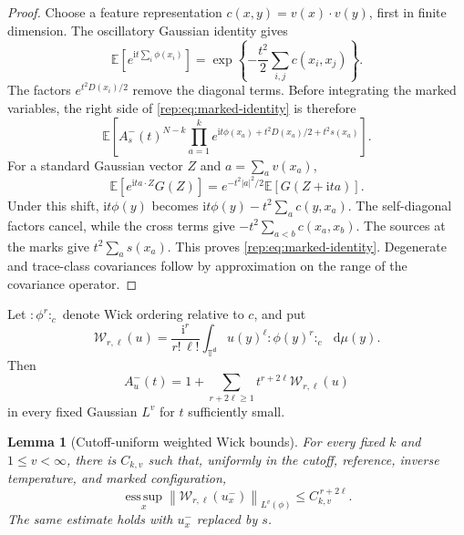 \documentclass[11pt,reqno]{amsart}
\numberwithin{equation}{section}
\theoremstyle{plain}
\newtheorem{lemma}[lemma]{Lemma}
\theoremstyle{definition}
\renewcommand{\d}{\mathsf d}
\newcommand{\dd}{\mathop{}\!\mathrm d}
\newcommand{\T}{\mathbb T}
\newcommand{\E}{\mathbb E}
\begin{document}
\begin{proof}
Choose a feature representation $c(x,y)=v(x)\cdot v(y)$, first in finite dimension. The oscillatory Gaussian identity gives
\begin{equation}\label{rep:eq:pre-shift}
 \E\left[e^{\mathrm{i} t\sum_i\phi(x_i)}\right]
 =\exp\left\{-\frac{t^2}{2}\sum_{i,j}c(x_i,x_j)\right\}.
\end{equation}
The factors $e^{t^2D(x_i)/2}$ remove the diagonal terms. Before integrating the marked variables, the right side of \eqref{rep:eq:marked-identity} is therefore
\begin{equation}\label{rep:eq:before-complex-shift}
 \E\left[A^-_s(t)^{N-k}\prod_{a=1}^k
 e^{\mathrm{i} t\phi(x_a)+t^2D(x_a)/2+t^2s(x_a)}\right].
\end{equation}
For a standard Gaussian vector $Z$ and $a=\sum_av(x_a)$,
\begin{equation}\label{rep:eq:complex-CM}
 \E\left[e^{\mathrm{i} t a\cdot Z}G(Z)\right]
 =e^{-t^2|a|^2/2}\E[G(Z+\mathrm{i} t a)].
\end{equation}
Under this shift, $\mathrm{i} t\phi(y)$ becomes $\mathrm{i} t\phi(y)-t^2\sum_ac(y,x_a)$. The self-diagonal factors cancel, while the cross terms give $-t^2\sum_{a<b}c(x_a,x_b)$. The sources at the marks give $t^2\sum_as(x_a)$. This proves \eqref{rep:eq:marked-identity}. Degenerate and trace-class covariances follow by approximation on the range of the covariance operator.
\end{proof}

Let $:\!\phi^r\!:_c$ denote Wick ordering relative to $c$, and put
\begin{equation}\label{rep:eq:weighted-Wick}
 \mathcal W_{r,\ell}(u)=\frac{\mathrm{i}^r}{r!\,\ell!}
 \int_{\T^{\d}}u(y)^\ell:\!\phi(y)^r\!:_c\,\dd\mu(y).
\end{equation}
Then
\begin{equation}\label{rep:eq:A-Wick-series}
 A^-_u(t)=1+\sum_{r+2\ell\ge1}t^{r+2\ell}\mathcal W_{r,\ell}(u)
\end{equation}
in every fixed Gaussian $L^v$ for $t$ sufficiently small.

\begin{lemma}[Cutoff-uniform weighted Wick bounds]\label{rep:lem:wick-bounds}
For every fixed $k$ and $1\le v<\infty$, there is $C_{k,v}$ such that, uniformly in the cutoff, reference, inverse temperature, and marked configuration,
\begin{equation}\label{rep:eq:Wick-geometric}
 \operatorname*{ess\,sup}_x\left\|\mathcal W_{r,\ell}(u_x^-)\right\|_{L^v(\phi)}
 \le C_{k,v}^{\,r+2\ell}.
\end{equation}
The same estimate holds with $u_x^-$ replaced by $s$.
\end{lemma}
\end{document}

